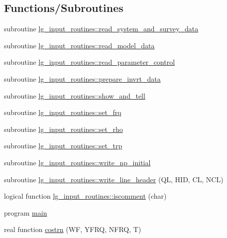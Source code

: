 \subsection*{Functions/\+Subroutines}
\begin{DoxyCompactItemize}
\item 
subroutine \hyperlink{namespacelg__input__routines_a80feb058541516d5a6327fb6c344bbbd}{lg\+\_\+input\+\_\+routines\+::read\+\_\+system\+\_\+and\+\_\+survey\+\_\+data}
\item 
subroutine \hyperlink{namespacelg__input__routines_a39e1903280f0492197231ab5fa752f21}{lg\+\_\+input\+\_\+routines\+::read\+\_\+model\+\_\+data}
\item 
subroutine \hyperlink{namespacelg__input__routines_a123f91865ea388eca78b77b0d625aa8c}{lg\+\_\+input\+\_\+routines\+::read\+\_\+parameter\+\_\+control}
\item 
subroutine \hyperlink{namespacelg__input__routines_a3118d974d52f2c98169709e887ceb344}{lg\+\_\+input\+\_\+routines\+::prepare\+\_\+invrt\+\_\+data}
\item 
subroutine \hyperlink{namespacelg__input__routines_a46a4ddc163c46adad59e863dadde86a3}{lg\+\_\+input\+\_\+routines\+::show\+\_\+and\+\_\+tell}
\item 
subroutine \hyperlink{namespacelg__input__routines_a836674acd30d52d3aa973722014aaa9f}{lg\+\_\+input\+\_\+routines\+::set\+\_\+frq}
\item 
subroutine \hyperlink{namespacelg__input__routines_a74107bd43614b32d8679e91def53e94d}{lg\+\_\+input\+\_\+routines\+::set\+\_\+rho}
\item 
subroutine \hyperlink{namespacelg__input__routines_aff8e77512771c5a25793784a8185d5b0}{lg\+\_\+input\+\_\+routines\+::set\+\_\+trp}
\item 
subroutine \hyperlink{namespacelg__input__routines_a1e34012960c952d22446828d97881001}{lg\+\_\+input\+\_\+routines\+::write\+\_\+np\+\_\+initial}
\item 
subroutine \hyperlink{namespacelg__input__routines_abb4589f0c8ad2d2d88f0f52aac5462e6}{lg\+\_\+input\+\_\+routines\+::write\+\_\+line\+\_\+header} (QL, H\+ID, CL, N\+CL)
\item 
logical function \hyperlink{namespacelg__input__routines_a8433a2003dce3e9ebdd1aa0a11e16538}{lg\+\_\+input\+\_\+routines\+::iscomment} (char)
\item 
program \hyperlink{Leroi__c_8f90_a8ec2266d83cd6c0b762cbcbc92c0af3d}{main}
\item 
real function \hyperlink{Leroi__c_8f90_a12a40dde1170214455093566ef5e8bb4}{costrn} (WF, Y\+F\+RQ, N\+F\+RQ, T)

\end{DoxyCompactItemize}
